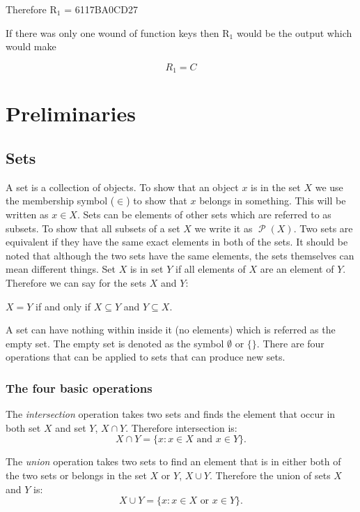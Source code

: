 \documentclass[11pt,a4paper]{report}
\DeclareMathOperator{\power}{\mathcal{P}}
\begin{document}
Therefore R$_{1}$ = 6117BA0CD27

If there was only one wound of function keys then R$_{1}$ would be the output which would make

\begin{displaymath}
R_{1} = C
\end{displaymath}

\chapter{Preliminaries}
\label{cha:prelim}


\section{Sets}
\label{sec:sets}

A set is a collection of objects. To show that an object $x$ is in the set $X$ we use the membership symbol ($\in$) to show that $x$ belongs in something. This will be written as $x \in X$. Sets can be elements of other sets which are referred to as subsets. To show that all subsets of a set $X$ we write it as $\power(X)$. Two sets are equivalent if they have the same exact elements in both of the sets. It should be noted that although the two sets have the same elements, the sets themselves can mean different things. Set $X$ is in set $Y$ if all elements of $X$ are an element of $Y$.
Therefore we can say for the sets $X$ and $Y$:
\begin{center}
  $X=Y$ if and only if $X \subseteq Y$ and $Y \subseteq X$.
\end{center}
A set can have nothing within inside it (no elements) which is referred as the empty set. The empty set is denoted as the symbol $\emptyset$ or $\{\}$. There are four operations that can be applied to sets that can produce new sets.  

\subsection{The four basic operations}
\label{sec:fourbasop}

The \emph{intersection} operation takes two sets and finds the element that occur in both set $X$ and set $Y$, $X \cap Y$. Therefore intersection is:
\begin{displaymath}
  X \cap Y = \{x : x \in X  \text{ and } x \in Y\}.
\end{displaymath}

The \emph{union} operation takes two sets to find an element that is in either both of the two sets or belongs in the set $X$ or $Y$, $X \cup Y$. Therefore the union of sets $X$ and $Y$ is:
\begin{displaymath}
  X \cup Y = \{x : x \in X  \text{ or } x \in Y\}.
\end{displaymath}
\end{document}
